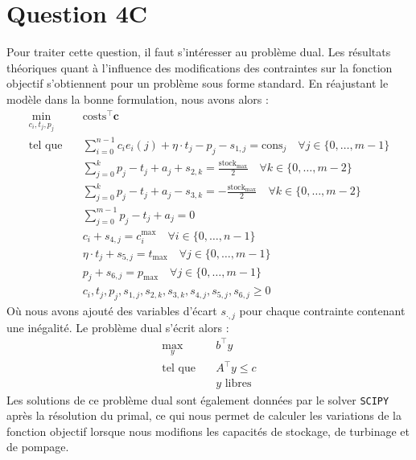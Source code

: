 \documentclass{article}
\begin{document}
\clearpage
\section*{Question 4C}
Pour traiter cette question, il faut s'intéresser au problème dual. Les résultats théoriques quant à l'influence des modifications des contraintes sur la fonction objectif s'obtiennent pour un problème sous forme standard.
En réajustant le modèle dans la bonne formulation, nous avons alors :
\begin{align}
    \min_{c_{i},t_j,p_j} \quad &\mathrm{costs}^\intercal\mathbf{c} \nonumber\\
    \textrm{tel que} \quad & \sum_{i=0}^{n-1} c_i e_i(j) + \eta \cdot t_j - p_j - s_{1,j} = \mathrm{cons}_j \quad \forall j \in  \{ 0, \ldots, m-1 \} \label{eq:4C_contr1}\\
    &\sum_{j=0}^{k} p_j - t_j + a_j + s_{2,k} =  \frac{\mathrm{stock}_\mathrm{max}}{2} \quad \forall k \in \{ 0, \ldots, m-2 \} \label{eq:4C_contr2}\\
    &\sum_{j=0}^{k} p_j - t_j + a_j - s_{3,k} =  -\frac{\mathrm{stock}_\mathrm{max}}{2} \quad \forall k \in \{ 0, \ldots, m-2 \} \label{eq:4C_contr3}\\
    & \sum_{j=0}^{m-1} p_j - t_j + a_j = 0\\
    &c_i + s_{4,j} = c_i^\mathrm{max} \quad \forall i \in  \{ 0, \ldots, n-1 \}\\
    &\eta \cdot t_j + s_{5,j} = t_\mathrm{max} \quad \forall j \in  \{ 0, \ldots, m-1 \} \label{eq:4C_contr6}\\
    &p_j + s_{6,j} = p_\mathrm{max} \quad \forall j \in  \{ 0, \ldots, m-1 \} \label{eq:4C_contr7}\\
    & c_i, t_j, p_j, s_{1,j}, s_{2,k}, s_{3,k}, s_{4,j}, s_{5,j}, s_{6,j} \geq 0
\end{align}
Où nous avons ajouté des variables d'écart $s_{\cdot,j}$ pour chaque contrainte contenant une inégalité.
Le problème dual s'écrit alors :
\begin{align*}
    \max_{y} \quad &b^\intercal y \quad\\ 
    \textrm{tel que} \quad &A^\intercal y \leq c\\
    & y \text{ libres}
\end{align*}
Les solutions de ce problème dual sont également données par le solver \verb|SCIPY| après la résolution du primal, ce qui nous permet de calculer les variations de la fonction objectif
lorsque nous modifions les capacités de stockage, de turbinage et de pompage.
\end{document}

